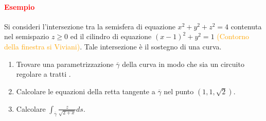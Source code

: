 \documentclass{article}
\begin{document}
\paragraph{\textcolor{red}{Esempio}}
Si consideri l'intersezione tra la semisfera di equazione $x^2+y^2+z^2=4$ contenuta nel semispazio $z \geq 0$ ed il cilindro di equazione $(x-1)^2+y^2=1$ \textcolor{orange}{(Contorno della finestra si Viviani)}. Tale intersezione è il sostegno di una curva.
\begin{enumerate}
    \item Trovare una parametrizzazione $\overline{\gamma}$ della curva in modo che sia un circuito regolare a tratti .
    \item Calcolare le equazioni della retta tangente a $\overline{\gamma}$ nel punto $(1,1,\sqrt{2})$.
    \item Calcolare $\int_{\overline{\gamma}}\frac{z}{\sqrt{2+x}}ds$.
\end{enumerate}
\end{document}
